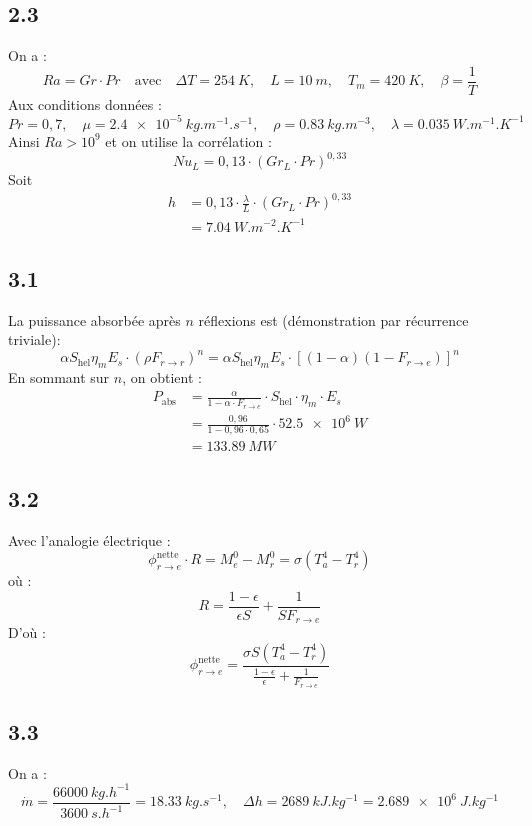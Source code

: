 \documentclass[12pt]{article}
\begin{document}
\subsection*{2.3}
On a :
\[
Ra = Gr \cdot Pr
\quad \text{avec} \quad 
\Delta T = \SI{254}{K},\quad L = \SI{10}{m},\quad T_m = \SI{420}{K},\quad \beta = \frac{1}{T}
\]
Aux conditions données :
\[
Pr = 0{,}7,\quad \mu = \SI{2,4e-5}{kg.m^{-1}.s^{-1}},\quad \rho = \SI{0,83}{kg.m^{-3}}, \quad \lambda = \SI{0,035}{W.m^{-1}.K^{-1}}
\]
Ainsi $Ra > 10^9$ et on utilise la corrélation :
\[
Nu_L = 0{,}13 \cdot (Gr_L \cdot Pr)^{0{,}33}
\]
Soit 
\begin{align*}
h &= 0{,}13 \cdot \frac{\lambda}{L} \cdot (Gr_L \cdot Pr)^{0{,}33} \\
&= \boxed{\SI{7,04}{W.m^{-2}.K^{-1}}}
\end{align*}

\subsection*{3.1}
La puissance absorbée après \( n \) réflexions est (démonstration par récurrence triviale):
\[
\alpha S_{\text{hel}} \eta_m E_s \cdot (\rho F_{r \rightarrow r})^n = \alpha S_{\text{hel}} \eta_m E_s \cdot \left[(1 - \alpha)(1 - F_{r \rightarrow e})\right]^n
\]
En sommant sur \( n \), on obtient :
\begin{align*}
P_{\text{abs}} &= \frac{\alpha}{1 - \alpha \cdot F_{r \rightarrow e}} \cdot S_{\text{hel}} \cdot \eta_m \cdot E_s \\
&= \frac{0{,}96}{1 - 0{,}96 \cdot 0{,}65} \cdot \SI{52.5e6}{W} \\
&= \boxed{\SI{133,89}{MW}}
\end{align*}

\subsection*{3.2}
Avec l'analogie électrique :
\[
\phi^{\text{nette}}_{r \rightarrow e} \cdot R = M^0_e - M^0_r = \sigma \left(T_a^4 - T_r^4\right)
\]
où :
\[
R = \frac{1 - \epsilon}{\epsilon S} + \frac{1}{S F_{r \rightarrow e}}
\]
D'où :
\[
\phi^{\text{nette}}_{r \rightarrow e} = \frac{\sigma S (T_a^4 - T_r^4)}{\frac{1 - \epsilon}{\epsilon} + \frac{1}{F_{r \rightarrow e}}}
\]

\subsection*{3.3}
On a :
\[
\dot{m} = \frac{\SI{66000}{kg.h^{-1}}}{\SI{3600}{s.h^{-1}}} = \SI{18.33}{kg.s^{-1}}, \quad
\Delta h = \SI{2689}{kJ.kg^{-1}} = \SI{2.689e6}{J.kg^{-1}}
\]
\end{document}
